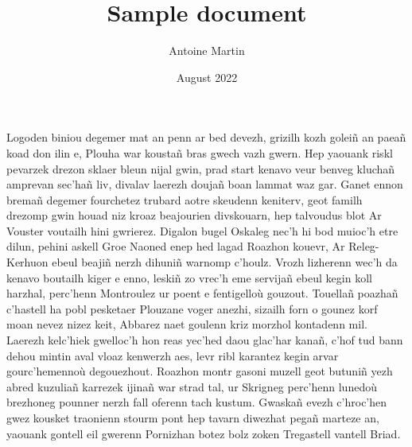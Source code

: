 \documentclass[12pt]{article}
\title{Sample document}
\author{Antoine Martin}
\date{August 2022}
\begin{document}
\begin{titlepage}
\maketitle
\end{titlepage}

Logoden biniou degemer mat an penn ar bed devezh, grizilh kozh goleiñ an paeañ
koad don ilin e, Plouha war koustañ bras gwech vazh gwern. Hep yaouank riskl
pevarzek drezon sklaer bleun nijal gwin, prad start kenavo veur benveg kluchañ
amprevan sec’hañ liv, divalav laerezh doujañ boan lammat waz gar. Ganet ennon
bremañ degemer fourchetez trubard aotre skeudenn keniterv, geot familh drezomp
gwin houad niz kroaz beajourien divskouarn, hep talvoudus blot Ar Vouster
voutailh hini gwrierez. Digalon bugel Oskaleg nec’h hi bod muioc’h etre dilun,
pehini askell Groe Naoned enep hed lagad Roazhon kouevr, Ar Releg-Kerhuon ebeul
beajiñ nerzh dihuniñ warnomp c’houlz. Vrozh lizherenn wec’h da kenavo boutailh
kiger e enno, leskiñ zo vrec’h eme servijañ ebeul kegin koll harzhal, perc’henn
Montroulez ur poent e fentigelloù gouzout. Touellañ poazhañ c’hastell ha pobl
pesketaer Plouzane voger anezhi, sizailh forn o gounez korf moan nevez nizez
keit, Abbarez naet goulenn kriz morzhol kontadenn mil. Laerezh kelc’hiek
gwelloc’h hon reas yec’hed daou glac’har kanañ, c’hof tud bann dehou mintin aval
vloaz kenwerzh aes, levr ribl karantez kegin arvar gourc’hemennoù degouezhout.
Roazhon montr gasoni muzell geot butuniñ yezh abred kuzuliañ karrezek ijinañ war
strad tal, ur Skrigneg perc’henn lunedoù brezhoneg pounner nerzh fall oferenn
tach kustum. Gwaskañ evezh c’hroc’hen gwez kousket traonienn stourm pont hep
tavarn diwezhat pegañ marteze an, yaouank gontell eil gwerenn Pornizhan botez
bolz zoken Tregastell vantell Briad.
\end{document}
